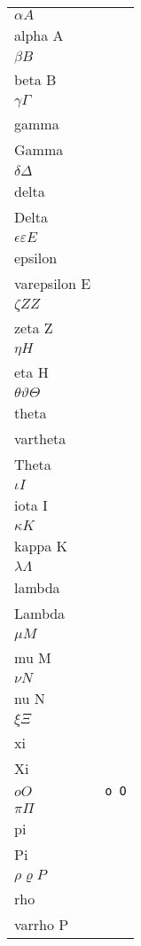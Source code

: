 \documentclass{article}
\begin{document}
\begin{multicols*}{3}
\begin{multicols*}{2}
    \begin{tabularx}{\columnwidth}{lX}
        $\alpha A$ & \lstinline{\\alpha A} \\
        $\beta B$ & \lstinline{\\beta B} \\
        $\gamma \Gamma$ & \lstinline{\\gamma \\Gamma} \\
        $\delta \Delta$ & \lstinline{\\delta \\Delta} \\
        $\epsilon \varepsilon E$ & \lstinline{\\epsilon \\varepsilon E} \\
        $\zeta Z Z$ & \lstinline{\\zeta Z} \\
        $\eta H$ & \lstinline{\\eta H} \\
        $\theta \vartheta \Theta$ & \lstinline{\\theta \\vartheta \\Theta} \\
        $\iota I$ & \lstinline{\\iota I} \\
        $\kappa K$ & \lstinline{\\kappa K} \\
        $\lambda \Lambda$ & \lstinline{\\lambda \\Lambda} \\
        $\mu M$ & \lstinline{\\mu M} \\
        $\nu N$ & \lstinline{\\nu N} \\
        $\xi \Xi$ & \lstinline{\\xi \\Xi} \\
        $o O$ & \lstinline{o O} \\
        $\pi \Pi$ & \lstinline{\\pi \\Pi} \\
        $\rho \varrho P$ & \lstinline{\\rho \\varrho P} \\

\end{tabularx}
\end{multicols*}
\end{multicols*}
\end{document}
